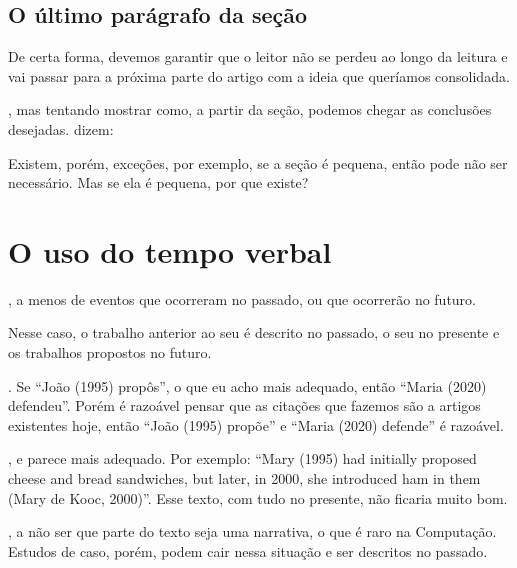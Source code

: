 \documentclass[openany]{book}
\begin{document}
\section{O último parágrafo da seção}

  De certa forma, devemos garantir que o leitor não se perdeu ao longo da leitura e vai passar para a próxima parte do artigo com a ideia que queríamos consolidada.

, mas tentando mostrar como, a partir da seção, podemos chegar as conclusões desejadas. \citet{Knuth:1997} dizem:


Existem, porém, exceções, por exemplo, se a seção é pequena, então pode não ser necessário. Mas se ela é pequena, por que existe?


\chapter{O uso do tempo verbal}

, a menos de eventos que ocorreram no passado, ou que ocorrerão no futuro.

 Nesse caso, o trabalho anterior ao seu é descrito no passado, o seu no presente e os trabalhos propostos no futuro.

. Se ``João (1995) propôs'', o que eu acho mais adequado, então ``Maria (2020) defendeu''. Porém é razoável pensar que as citações que fazemos são a artigos existentes hoje, então ``João (1995) propõe'' e ``Maria (2020) defende'' é razoável.

, e parece mais adequado. Por exemplo: ``Mary (1995) had initially proposed cheese and bread sandwiches, but later, in 2000, she introduced ham in them (Mary de Kooc, 2000)''. Esse texto, com tudo no presente, não ficaria muito bom.

, a não ser que parte do texto seja uma narrativa, o que é raro na Computação. Estudos de caso, porém, podem cair nessa situação e ser descritos no passado.
\end{document}
